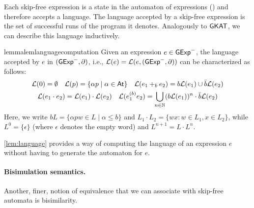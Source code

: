 \documentclass[orivec,envcountsect,envcountsame]{llncs}
\begin{document}
    Each skip-free \GKAT expression is a state in the automaton of expressions () and therefore accepts a language.
    The language accepted by a skip-free \GKAT expression is the set of successful runs of the program it denotes.
    Analogously to $\textsf{GKAT}$, we can describe this language inductively.

    \begin{restatable}{lemma}{lemlanguagecomputation}\label{lem:language}
       Given an expression $e\in \mathsf{GExp}^-$, the language accepted by $e$ in \((\mathsf{GExp}^-, \partial)\), i.e., $\mathcal{L}(e) = \mathcal{L}(e, (\mathsf{GExp}^-, \partial))$ can be characterized as follows:
        \begin{gather*}
            \mathcal{L}(0) = \emptyset
            \quad
            \mathcal{L}(p) = \{\alpha p \mid \alpha \in \mathsf{At}\}
            \quad
            \mathcal{L}(e_1 +_b e_2) = b\mathcal{L}(e_1) \cup \bar b\mathcal{L}(e_2)
            \\
            \mathcal{L}(e_1\cdot e_2) = \mathcal{L}(e_1)\cdot \mathcal{L}(e_2)
            \quad
            \mathcal{L}(e_1^{(b)}e_2) = \bigcup_{n \in \mathbb N} (b\mathcal{L}(e_1))^n\cdot\bar b\mathcal{L}(e_2)
        \end{gather*}
        Here, we write \(b L = \{\alpha p w \in L \mid \alpha \leq b\}\) and \(L_1 \cdot L_2 = \{ wx : w \in L_1, x \in L_2 \} \), while $L^0 = \{ \epsilon \}$ (where $\epsilon$ denotes the empty word) and $L^{n+1} = L \cdot L^n$.
    \end{restatable}

    \cref{lem:language} provides a way of computing the language of an expression $e$ without having to generate the automaton for $e$.



    \paragraph{\bf Bisimulation semantics.}
       Another, finer, notion of equivalence that we can associate with skip-free automata is bisimilarity. %
\end{document}
